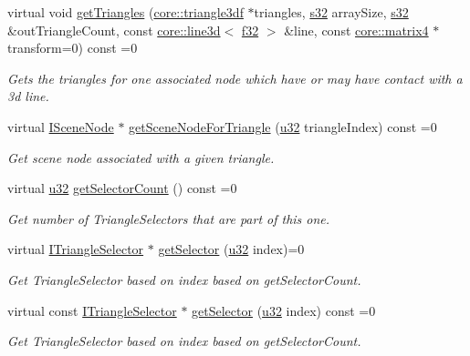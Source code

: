 \begin{DoxyCompactItemize}
virtual void \hyperlink{classirr_1_1scene_1_1ITriangleSelector_a398ca75a20cc0e44abdb13a459136720}{get\+Triangles} (\hyperlink{namespaceirr_1_1core_a8983bda2678a7a67d97bf3c7be6c31c7}{core\+::triangle3df} $\ast$triangles, \hyperlink{namespaceirr_ac66849b7a6ed16e30ebede579f9b47c6}{s32} array\+Size, \hyperlink{namespaceirr_ac66849b7a6ed16e30ebede579f9b47c6}{s32} \&out\+Triangle\+Count, const \hyperlink{classirr_1_1core_1_1line3d}{core\+::line3d}$<$ \hyperlink{namespaceirr_a0277be98d67dc26ff93b1a6a1d086b07}{f32} $>$ \&line, const \hyperlink{namespaceirr_1_1core_a4c9d4e29899535971052810954a14431}{core\+::matrix4} $\ast$transform=0) const =0
\begin{DoxyCompactList}\small\item\em Gets the triangles for one associated node which have or may have contact with a 3d line. \end{DoxyCompactList}\item 
virtual \hyperlink{classirr_1_1scene_1_1ISceneNode}{I\+Scene\+Node} $\ast$ \hyperlink{classirr_1_1scene_1_1ITriangleSelector_a9b180f4d9e273a6c1cda9afeb3b1c98b}{get\+Scene\+Node\+For\+Triangle} (\hyperlink{namespaceirr_a0416a53257075833e7002efd0a18e804}{u32} triangle\+Index) const =0
\begin{DoxyCompactList}\small\item\em Get scene node associated with a given triangle. \end{DoxyCompactList}\item 
virtual \hyperlink{namespaceirr_a0416a53257075833e7002efd0a18e804}{u32} \hyperlink{classirr_1_1scene_1_1ITriangleSelector_ae0d51279cab70e31a6aa2646e3b05df4}{get\+Selector\+Count} () const =0
\begin{DoxyCompactList}\small\item\em Get number of Triangle\+Selectors that are part of this one. \end{DoxyCompactList}\item 
virtual \hyperlink{classirr_1_1scene_1_1ITriangleSelector}{I\+Triangle\+Selector} $\ast$ \hyperlink{classirr_1_1scene_1_1ITriangleSelector_a51e15d33c41642441a311a33d2f1ebed}{get\+Selector} (\hyperlink{namespaceirr_a0416a53257075833e7002efd0a18e804}{u32} index)=0
\begin{DoxyCompactList}\small\item\em Get Triangle\+Selector based on index based on get\+Selector\+Count. \end{DoxyCompactList}\item 
virtual const \hyperlink{classirr_1_1scene_1_1ITriangleSelector}{I\+Triangle\+Selector} $\ast$ \hyperlink{classirr_1_1scene_1_1ITriangleSelector_ad5d221ea393e67872c902d35e77fa69e}{get\+Selector} (\hyperlink{namespaceirr_a0416a53257075833e7002efd0a18e804}{u32} index) const =0
\begin{DoxyCompactList}\small\item\em Get Triangle\+Selector based on index based on get\+Selector\+Count. \end{DoxyCompactList}\end{DoxyCompactItemize}
